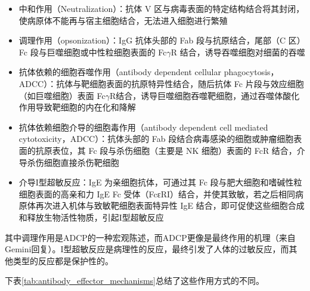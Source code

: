 \documentclass[9pt,a4paper,twoside]{rho-class/rho}
\begin{document}
        \begin{itemize}
            \item 中和作用（Neutralization）：抗体 V 区与病毒表面的特定结构结合将其封闭，使病原体不能再与宿主细胞结合，无法进入细胞进行繁殖
            \item 调理作用（opsonization）：IgG 抗体头部的 Fab 段与抗原结合，尾部（C 区）Fc 段与巨噬细胞或中性粒细胞表面的 Fc$\gamma$R 结合，诱导吞噬细胞对细菌的吞噬
            \item 抗体依赖的细胞吞噬作用（antibody dependent cellular phagocytosis， ADCC）：抗体与靶细胞表面的抗原特异性结合，随后抗体 Fc 片段与效应细胞（如巨噬细胞）表面 Fc$\gamma$R结合，诱导巨噬细胞吞噬靶细胞，通过吞噬体酸化作用导致靶细胞的内在化和降解
            \item 抗体依赖细胞介导的细胞毒作用（antibody dependent cell mediated cytotoxicity，ADCC）：抗体头部的 Fab 段结合病毒感染的细胞或肿瘤细胞表面的抗原表位，其 Fc 段与杀伤细胞（主要是 NK 细胞）表面的 FcR 结合，介导杀伤细胞直接杀伤靶细胞
            \item 介导I型超敏反应：IgE 为亲细胞抗体，可通过其 Fc 段与肥大细胞和嗜碱性粒细胞表面的高亲和力 IgE Fc 受体（FcεRI）结合，并使其致敏，若之后相同病原体再次进入机体与致敏靶细胞表面特异性 IgE 结合，即可促使这些细胞合成和释放生物活性物质，引起I型超敏反应
        \end{itemize}

        其中调理作用是ADCP的一种宏观陈述，而ADCP更像是最终作用的机理（来自Gemini回复）。I型超敏反应是病理性的反应，最终引发了人体的过敏反应，而其他类型的反应都是保护性的。

        下表\ref{tab:antibody_effector_mechanisms}总结了这些作用方式的不同。
\end{document}
